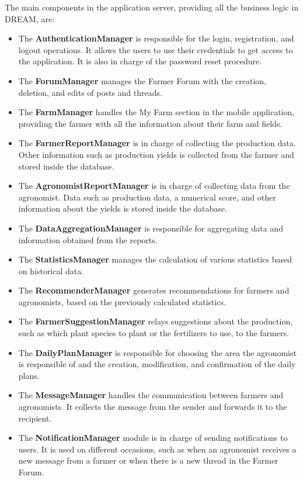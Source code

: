 \noindent
The main components in the application server, providing all the business logic in DREAM, are:

\begin{itemize}
	\item The \textbf{AuthenticationManager} is responsible for the login, registration, and logout operations. It allows the users to use their credentials to get access to the application. It is also in charge of the password reset procedure.
	\item The \textbf{ForumManager} manages the Farmer Forum with the creation, deletion, and edits of posts and threads. 
	\item The \textbf{FarmManager} handles the My Farm section in the mobile application, providing the farmer with all the information about their farm and fields.
	\item The \textbf{FarmerReportManager} is in charge of collecting the production data. Other information such as production yields is collected from the farmer and stored inside the database.
	\item The \textbf{AgronomistReportManager} is in charge of collecting data from the agronomist. Data such as production data, a numerical score, and other information about the yields is stored inside the database.
	\item The \textbf{DataAggregationManager} is responsible for aggregating data and information obtained from the reports.
	\item The \textbf{StatisticsManager} manages the calculation of various statistics based on historical data.
	\item The \textbf{RecommenderManager} generates recommendations for farmers and agronomists, based on the previously calculated statistics.
	\item The \textbf{FarmerSuggestionManager} relays suggestions about the production, such as which plant species to plant or the fertilizers to use, to the farmers.
	\item The \textbf{DailyPlanManager} is responsible for choosing the area the agronomist is responsible of and the creation, modification, and confirmation of the daily plans.
	\item The \textbf{MessageManager} handles the communication between farmers and agronomists. It collects the message from the sender and forwards it to the recipient.
	\item The \textbf{NotificationManager} module is in charge of sending notifications to users. It is used on different occasions, such as when an agronomist receives a new message from a farmer or when there is a new thread in the Farmer Forum.

\end{itemize}
